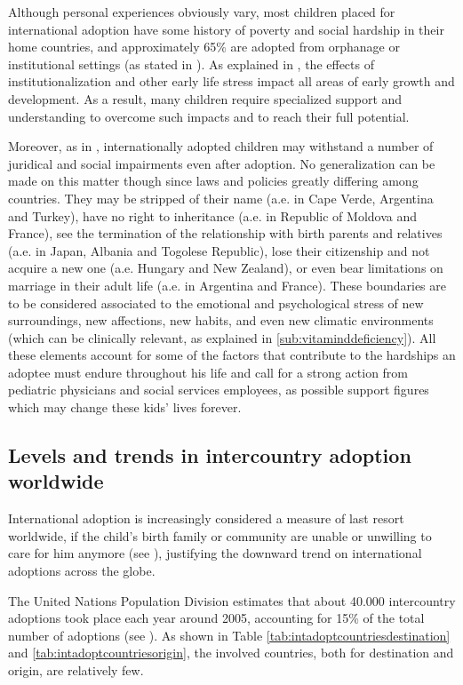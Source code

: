 Although personal experiences obviously vary, most children placed for international adoption have some history of poverty and social hardship in their home countries, and approximately 65\% are adopted from orphanage or institutional settings (as stated in \cite{caringfor}). As explained in \cite{nelson}, the effects of institutionalization and other early life stress impact all areas of early growth and development. As a result, many children require specialized support and understanding to overcome such impacts and to reach their full potential. 

Moreover, as in \cite{unreport}, internationally adopted children may withstand a number of juridical and social impairments even after adoption. No generalization can be made on this matter though since laws and policies greatly differing among countries. They may be stripped of their name (a.e. in Cape Verde, Argentina and Turkey), have no right to inheritance (a.e. in Republic of Moldova and France), see the termination of the relationship with birth parents and relatives (a.e. in Japan, Albania and Togolese Republic), lose their citizenship and not acquire a new one (a.e. Hungary and New Zealand), or even bear limitations on marriage in their adult life (a.e. in Argentina and France). These boundaries are to be considered associated to the emotional and psychological stress of new surroundings, new affections, new habits, and even new climatic environments (which can be clinically relevant, as explained in \ref{sub:vitaminddeficiency}). \linebreak All these elements account for some of the factors that contribute to the hardships an adoptee must endure throughout his life and call for a strong action from pediatric physicians and social services employees, as possible support figures which may change these kids' lives forever.

\subsection{Levels and trends in intercountry adoption worldwide}\label{sub:levelsintercountry}
International adoption is increasingly considered a measure of last resort worldwide, if the child's birth family or community are unable or unwilling to care for him anymore (see \cite{nelson}), justifying the downward trend on international adoptions across the globe. 

The United Nations Population Division estimates that about 40.000 intercountry adoptions took place each year around 2005, accounting for 15\% of the total number of adoptions (see \cite{unreport}). As shown in Table \ref{tab:intadoptcountriesdestination} and \ref{tab:intadoptcountriesorigin}, the involved countries, both for destination and origin, are relatively few.

